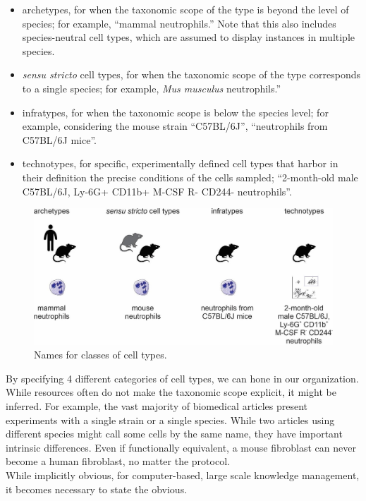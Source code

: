 \begin{itemize}
\tightlist
\item
  archetypes, for when the taxonomic scope of the type is beyond the level of species; for example, ``mammal neutrophils.'' Note that this also includes species-neutral cell types, which are assumed to display instances in multiple species.
\item
  \emph{sensu stricto} cell types, for when the taxonomic scope of the type corresponds to a single species; for example, \emph{Mus musculus} neutrophils.''
\item
  infratypes, for when the taxonomic scope is below the species level; for example, considering the mouse strain ``C57BL/6J'', ``neutrophils from C57BL/6J mice''.
\item
  technotypes, for specific, experimentally defined cell types that harbor in their definition the precise conditions of the cells sampled; ``2-month-old male C57BL/6J, Ly-6G+ CD11b+ M-CSF R- CD244- neutrophils''.
\end{itemize}

\begin{figure}
\hypertarget{fig:classes}{%
\centering
\includegraphics[width=0.85\columnwidth]{images/archetypes_hn.jpg}
\caption{Names for classes of cell types.}\label{fig:classes}
}
\end{figure}

By specifying 4 different categories of cell types, we can hone in our organization.
While resources often do not make the taxonomic scope explicit, it might be inferred.
For example, the vast majority of biomedical articles present experiments with a single strain or a single species.
While two articles using different species might call some cells by the same name, they have important intrinsic differences.
Even if functionally equivalent, a mouse fibroblast can never become a human fibroblast, no matter the protocol.\\
While implicitly obvious, for computer-based, large scale knowledge management, it becomes necessary to state the obvious.

